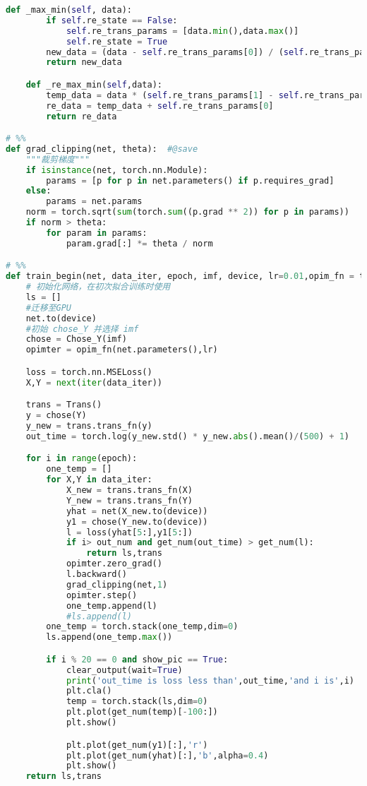 \begin{appendices}
\begin{lstlisting}[language=python]
    def _max_min(self, data):
        if self.re_state == False:
            self.re_trans_params = [data.min(),data.max()]
            self.re_state = True
        new_data = (data - self.re_trans_params[0]) / (self.re_trans_params[1] - self.re_trans_params[0])
        return new_data

    def _re_max_min(self,data):
        temp_data = data * (self.re_trans_params[1] - self.re_trans_params[0])
        re_data = temp_data + self.re_trans_params[0]
        return re_data

# %%
def grad_clipping(net, theta):  #@save
    """裁剪梯度"""
    if isinstance(net, torch.nn.Module):
        params = [p for p in net.parameters() if p.requires_grad]
    else:
        params = net.params
    norm = torch.sqrt(sum(torch.sum((p.grad ** 2)) for p in params))
    if norm > theta:
        for param in params:
            param.grad[:] *= theta / norm

# %%
def train_begin(net, data_iter, epoch, imf, device, lr=0.01,opim_fn = torch.optim.Adam,out_num = 1000, show_pic = True):
    # 初始化网络，在初次拟合训练时使用
    ls = []
    #迁移至GPU
    net.to(device)
    #初始 chose_Y 并选择 imf
    chose = Chose_Y(imf)
    opimter = opim_fn(net.parameters(),lr)

    loss = torch.nn.MSELoss()
    X,Y = next(iter(data_iter))

    trans = Trans()
    y = chose(Y)
    y_new = trans.trans_fn(y)
    out_time = torch.log(y_new.std() * y_new.abs().mean()/(500) + 1)

    for i in range(epoch):
        one_temp = []
        for X,Y in data_iter:
            X_new = trans.trans_fn(X)
            Y_new = trans.trans_fn(Y)
            yhat = net(X_new.to(device))
            y1 = chose(Y_new.to(device))
            l = loss(yhat[5:],y1[5:])
            if i> out_num and get_num(out_time) > get_num(l):
                return ls,trans
            opimter.zero_grad()
            l.backward()
            grad_clipping(net,1)
            opimter.step()
            one_temp.append(l)
            #ls.append(l)
        one_temp = torch.stack(one_temp,dim=0)
        ls.append(one_temp.max())

        if i % 20 == 0 and show_pic == True:
            clear_output(wait=True)
            print('out_time is loss less than',out_time,'and i is',i)
            plt.cla()
            temp = torch.stack(ls,dim=0)
            plt.plot(get_num(temp)[-100:])
            plt.show()

            plt.plot(get_num(y1)[:],'r')
            plt.plot(get_num(yhat)[:],'b',alpha=0.4)
            plt.show()
    return ls,trans


\end{lstlisting}
\end{appendices}
